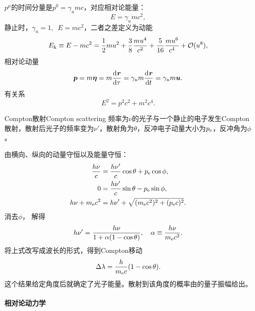 $p^\mu$的时间分量是$p^0 = \gamma_umc$，对应相对论能量：
\begin{equation}
    \label{eq:ed-relativistic-energy}
    E = \gamma_umc^2,
\end{equation}
静止时，$\gamma_u = 1,\enspace E = mc^2$，二者之差定义为动能
\[
    E_{\mathrm{k}} \equiv E - mc^2 = \frac12mu^2 + \frac38\frac{mu^4}{c^2} + \frac5{16}\frac{mu^6}{c^4} + \mathcal{O}(u^8),
\]
相对论动量
\begin{equation}
    \label{eq:ed-relativistic-momentum}
    \bm p = m\bm\eta = m\frac{\mathop{}\!\mathrm{d}^{}\bm r}{\mathrm{d}{\tau}^{}} = \gamma_um\frac{\mathop{}\!\mathrm{d}^{}\bm r}{\mathrm{d}{t}^{}} = \gamma_um\bm u.
\end{equation}
有关系
\begin{equation}
    E^2 = p^2c^2 + m^2c^4.
\end{equation}
\begin{example}{Compton散射}{Compton scattering}
    频率为$\nu$的光子与一个静止的电子发生Compton散射，散射后光子的频率变为$\nu'$，散射角为$\theta$，反冲电子动量大小为$p_{\mathrm{e}}$，反冲角为$\phi$。
    \begin{notecaptionblock}
    \end{notecaptionblock}
    由横向、纵向的动量守恒以及能量守恒：
    \begin{subequations}
        \begin{align}
            \frac{h\nu}c &= \frac{h\nu'}c\cos\theta + p_{\mathrm{e}}\cos\phi,\\
            0 &= \frac{h\nu'}c\sin\theta - p_{\mathrm{e}}\sin\phi,\\
            h\nu + m_{\mathrm{e}} c^2 &= h\nu' + \sqrt{(m_{\mathrm{e}} c^2)^2 + (p_{\mathrm{e}} c)^2}.
        \end{align}
    \end{subequations}
    消去$\phi$，
    解得
    \begin{equation}
        h\nu' = \frac{h\nu}{1 + \alpha(1 - \cos\theta)},\quad\alpha \equiv \frac{h\nu}{m_{\mathrm{e}} c^2}.
    \end{equation}
    将上式改写成波长的形式，得到Compton移动
    \begin{equation}
        \Delta\lambda = \frac h{m_{\mathrm{e}} c}(1 - \cos\theta).
    \end{equation}
    这个结果给定角度后就确定了光子能量。散射到该角度的概率由的量子振幅给出。
\end{example}

\paragraph{相对论动力学}


